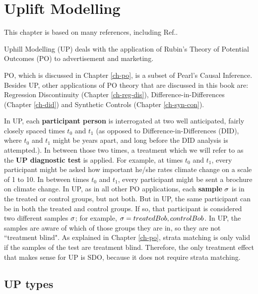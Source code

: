\chapter{Uplift Modelling}
\label{ch-uplift}



This chapter is based 
on 
many references,
including Ref.\cite{uplift-2017, fei, wiki-uplift,jaros}.

Uphill Modelling (UP)
deals
with  the application of
Rubin's Theory of
Potential Outcomes (PO)
to advertisement and marketing.

PO, which is
discussed in Chapter \ref{ch-po},
 is a subset
of Pearl's Causal Inference.
Besides UP, other  applications of PO theory
that are discussed in this book 
are: Regression Discontinuity (Chapter \ref{ch-reg-dis}),
Difference-in-Differences (Chapter \ref{ch-did})
and Synthetic Controls (Chapter \ref{ch-syn-con}).

In UP,
each {\bf participant person}
is interrogated at two well
anticipated, fairly closely spaced times
$t_0$ and $t_1$ (as opposed to 
Difference-in-Differences  (DID), where
$t_0$ and $t_1$ might
be years apart, and
long before the DID analysis is 
attempted.).
In between those two times,
a treatment which
we will refer to as the
{\bf UP diagnostic test} is applied.
For example,
at times $t_0$ and $t_1$,
every participant
might be asked
how important he/she rates climate 
change on a scale of 1 to 10.
In between times
$t_0$ and $t_1$,
every participant might
be sent a brochure on climate change.
In UP, as in all 
other PO applications, 
each {\bf sample}
$\sigma$
is in the 
treated or control
groups, but not both.
But in UP,
the same participant can be
in both the 
treated and control groups.
If so, that participant
is considered two different samples $\sigma$;
for example, $\sigma=treated Bob, control Bob$.
In UP,
the samples
are aware  of which
of those groups they are in,
so they are not ``treatment blind".
As explained in 
Chapter \ref{ch-po},
strata matching is only valid
if the samples
of the test are treatment blind.
Therefore, the only
treatment effect that 
makes sense for UP is SDO,
because it
 does not require strata matching.

\section{UP types}

